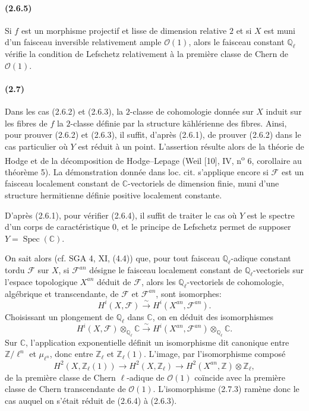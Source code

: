 \documentclass[10pt]{article}
\newcommand{\Z}{\mathbb Z}
\newcommand{\iso}{\xrightarrow{\sim}}
\providecommand{\C}{\mathbb C}
\providecommand{\Ql}{\mathbb Q_\ell}
\providecommand{\Zl}{\mathbb Z_\ell}
\providecommand{\Spec}{\operatorname{Spec}}
\begin{document}
\paragraph{(2.6.5)} Si $f$ est un morphisme projectif et lisse de dimension relative $2$ et si $X$ est muni d'un faisceau inversible relativement ample $\mathcal O(1)$, alors le faisceau constant $\Ql$ vérifie la condition de Lefschetz relativement à la première classe de Chern de $\mathcal O(1)$.

\paragraph{(2.7)} Dans les cas (2.6.2) et (2.6.3), la $2$-classe de cohomologie donnée sur $X$ induit sur les fibres de $f$ la $2$-classe définie par la structure kählérienne des fibres. Ainsi, pour prouver (2.6.2) et (2.6.3), il suffit, d'après (2.6.1), de prouver (2.6.2) dans le cas particulier où $Y$ est réduit à un point. L'assertion résulte alors de la théorie de Hodge et de la décomposition de Hodge--Lepage (Weil [10], IV, n\textsuperscript{o} 6, corollaire au théorème 5). La démonstration donnée dans loc. cit. s'applique encore si $\mathcal F$ est un faisceau localement constant de $\C$-vectoriels de dimension finie, muni d'une structure hermitienne définie positive localement constante.

D'après (2.6.1), pour vérifier (2.6.4), il suffit de traiter le cas où $Y$ est le spectre d'un corps de caractéristique $0$, et le principe de Lefschetz permet de supposer $Y=\Spec(\C)$.

On sait alors (cf. SGA 4, XI, (4.4)) que, pour tout faisceau $\Ql$-adique constant tordu $\mathcal F$ sur $X$, si $\mathcal F^{an}$ désigne le faisceau localement constant de $\Ql$-vectoriels sur l'espace topologique $X^{an}$ déduit de $\mathcal F$, alors les $\Ql$-vectoriels de cohomologie, algébrique et transcendante, de $\mathcal F$ et $\mathcal F^{an}$, sont isomorphes:
\[
\tag{2.7.2}
H^i(X,\mathcal F)\iso H^i(X^{an},\mathcal F^{an}).
\]
Choisissant un plongement de $\Ql$ dans $\C$, on en déduit des isomorphismes
\[
\tag{2.7.3}
H^i(X,\mathcal F)\otimes_{\Ql}\C\iso
H^i(X^{an},\mathcal F^{an})\otimes_{\Ql}\C.
\]
Sur $\C$, l'application exponentielle définit un isomorphisme dit canonique entre $\Z/\ell^n$ et $\mu_{\ell^n}$, donc entre $\Zl$ et $\Zl(1)$. L'image, par l'isomorphisme composé
\[
H^2(X,\Zl(1))\longrightarrow H^2(X,\Zl)\longrightarrow H^2(X^{an},\Z)\otimes\Zl,
\]
de la première classe de Chern $\ell$-adique de $\mathcal O(1)$ coïncide avec la première classe de Chern transcendante de $\mathcal O(1)$. L'isomorphisme (2.7.3) ramène donc le cas auquel on s'était réduit de (2.6.4) à (2.6.3).
\end{document}

